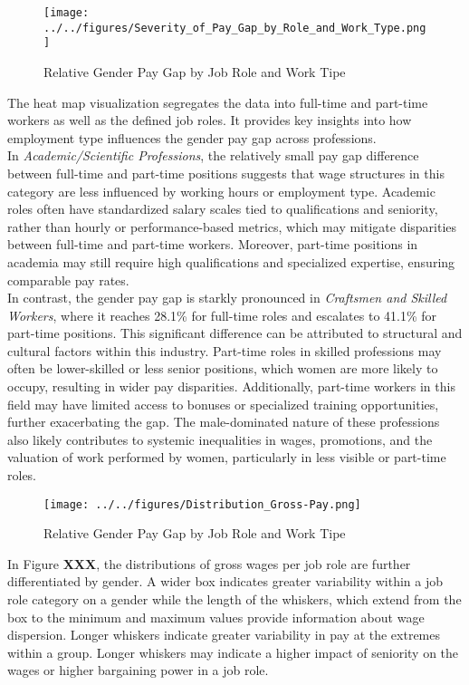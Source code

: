 \documentclass{article}
\begin{document}
\begin{figure}[h]
    \centering
    \texttt{[image: ../../figures/Severity\_of\_Pay\_Gap\_by\_Role\_and\_Work\_Type.png]}
    \caption{Relative Gender Pay Gap by Job Role and Work Tipe}
    \label{fig:rates_time}
\end{figure}

The heat map visualization segregates the data into full-time and part-time workers as well as the defined job roles. It provides key insights into how employment type influences the gender pay gap across professions. \\
In \textit{Academic/Scientific Professions}, the relatively small pay gap difference between full-time and part-time positions suggests that wage structures in this category are less influenced by working hours or employment type. Academic roles often have standardized salary scales tied to qualifications and seniority, rather than hourly or performance-based metrics, which may mitigate disparities between full-time and part-time workers. Moreover, part-time positions in academia may still require high qualifications and specialized expertise, ensuring comparable pay rates. \\

In contrast, the gender pay gap is starkly pronounced in \textit{Craftsmen and Skilled Workers}, where it reaches 28.1\% for full-time roles and escalates to 41.1\% for part-time positions. This significant difference can be attributed to structural and cultural factors within this industry. Part-time roles in skilled professions may often be lower-skilled or less senior positions, which women are more likely to occupy, resulting in wider pay disparities. Additionally, part-time workers in this field may have limited access to bonuses or specialized training opportunities, further exacerbating the gap. The male-dominated nature of these professions also likely contributes to systemic inequalities in wages, promotions, and the valuation of work performed by women, particularly in less visible or part-time roles.\\

\begin{figure}[h]
    \centering
    \texttt{[image: ../../figures/Distribution\_Gross-Pay.png]}
    \caption{Relative Gender Pay Gap by Job Role and Work Tipe}
    \label{fig:rates_time}
\end{figure}

In Figure \textbf{XXX}, the distributions of gross wages per job role are further differentiated by gender. A wider box indicates greater variability within a job role category on a gender while the length of the whiskers, which extend from the box to the minimum and maximum values provide information about wage dispersion. Longer whiskers indicate greater variability in pay at the extremes within a group. Longer whiskers may indicate a higher impact of seniority on the wages or higher bargaining power in a job role. \\
\end{document}
